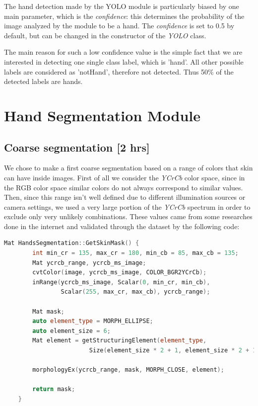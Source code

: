 The hand detection made by the YOLO module is particularly biased by one main
parameter, which is the \textit{confidence}: this determines the
probability of the image analyzed by the module to be a hand. The
\textit{confidence} is set to 0.5 by default, but can be changed in the
constructor of the \textit{YOLO} class.

The main reason for such a low confidence value is the simple fact that we are
interested in detecting one single class label, which is 'hand'. All other
possible labels are considered as
'notHand', therefore not detected. Thus 50\% of the detected labels are hands.

\section{Hand Segmentation Module}

\subsection{Coarse segmentation [2 hrs]}
We chose to make a first coarse segmentation based on a range of colors that
skin can have inside images. First of all we consider the \textit{YCrCb} color
space, since in the RGB color space similar colors do not always correspond to
similar values. Then, since this range isn't well defined due to
different illumination sources or camera settings, we used a very large portion
of the \textit{YCrCb} spectrum in order to exclude only very unlikely
combinations. These values came from some researches done in the internet and
validated through the dataset by the following code:

\begin{lstlisting}[language = c++]
    Mat HandsSegmentation::GetSkinMask() {
        int min_cr = 135, max_cr = 180, min_cb = 85, max_cb = 135;
        Mat ycrcb_range, ycrcb_ms_image;
        cvtColor(image, ycrcb_ms_image, COLOR_BGR2YCrCb);
        inRange(ycrcb_ms_image, Scalar(0, min_cr, min_cb), 
                Scalar(255, max_cr, max_cb), ycrcb_range);
    
        Mat mask;
        auto element_type = MORPH_ELLIPSE;
        auto element_size = 6;
        Mat element = getStructuringElement(element_type, 
                        Size(element_size * 2 + 1, element_size * 2 + 1));

        morphologyEx(ycrcb_range, mask, MORPH_CLOSE, element);
    
        return mask;
    }
\end{lstlisting}

